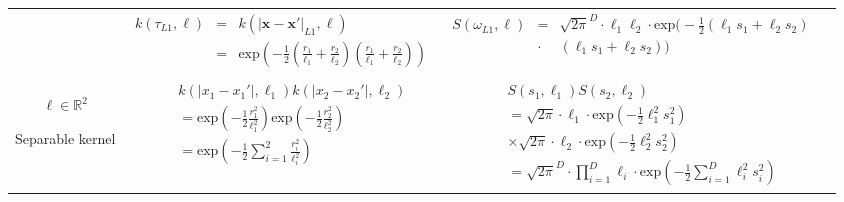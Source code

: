 \documentclass[]{interact}
\theoremstyle{plain}%
\theoremstyle{definition}
\theoremstyle{remark}
\begin{document}
\begin{landscape}
\begin{table}[H]
\begin{center}
\begin{tabular}{|c|c|c|c|}
         & \multicolumn{1}{|p{8.2cm}|}{
         \begin{eqnarray*}
		k(\tau_{L1},\bm{\ell}) &=& k(|\bm{x}-\bm{x}'|_{L1},\bm{\ell})\\
		&=& \mathrm{exp}\left(-\frac{1}{2} \left(\frac{r_1}{\ell_1} + \frac{r_2}{\ell_2}\right)\left(\frac{r_1}{\ell_1} + \frac{r_2}{\ell_2}\right) \right)
         \end{eqnarray*}
       }
       
       & \multicolumn{1}{|p{8.2cm}|}{
         \begin{eqnarray*}
		S(\omega_{L1},\bm{\ell}) &=& \sqrt{2\pi}^D \cdot \ell_1 \ell_2 \cdot \mathrm{exp}\Big(-\frac{1}{2} (\ell_1 s_1 + \ell_2 s_2)\\
		&\cdot &(\ell_1 s_1 + \ell_2 s_2) \Big) \\
         \end{eqnarray*}
       }
		
       & \multicolumn{1}{|p{5.2cm}|}{

       } \\  
       \vspace{-15mm}\\
       \cline{1-3}
       
       \multicolumn{1}{|p{1.5cm}|}{
       \vspace{1mm}
        $\bm{\ell} \in \mathbb{R}^2$
        
       {Separable kernel} 
       }
       
        & \multicolumn{1}{|p{8.2cm}|}{
         \begin{eqnarray*}
		&&k(|x_1-x_1'|,\ell_1)k(|x_2-x_2'|,\ell_2) \\
		&&= \mathrm{exp}\left(-\frac{1}{2} \frac{r_1^2}{\ell_1^2} \right) \mathrm{exp}\left(-\frac{1}{2} \frac{r_2^2}{\ell_2^2} \right)\\
		&&= \mathrm{exp}\left(-\frac{1}{2} \sum_{i=1}^{2}\frac{r_i^2}{\ell_i^2} \right)
         \end{eqnarray*}
       }
       
       & \multicolumn{1}{|p{8.2cm}|}{
       \begin{eqnarray*}
		&&S(s_1,\ell_1)S(s_2,\ell_2) \\
		&&= \sqrt{2\pi} \cdot \ell_1 \cdot \mathrm{exp}\left(-\frac{1}{2} \ell_1^2 s_1^2 \right) \\
		&& \times \sqrt{2\pi} \cdot \ell_2 \cdot \mathrm{exp}\left(-\frac{1}{2} \ell_2^2 s_2^2 \right)\\
		&&= \sqrt{2\pi}^D \cdot \prod_{i=1}^D \ell_i \cdot \mathrm{exp}\left(-\frac{1}{2} \sum_{i=1}^D \ell_i^2 s_i^2 \right)
		\end{eqnarray*}
       } 


\end{tabular}
\end{center}
\end{table}
\end{landscape}
\end{document}
